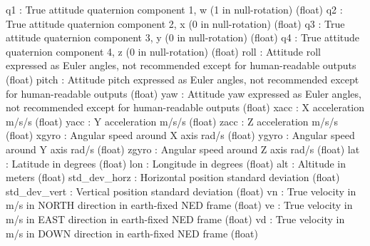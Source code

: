 \begin{DoxyVerb}
\begin{DoxyVerb}
\begin{DoxyVerb}
\begin{DoxyVerb}
\begin{DoxyVerb}
\begin{DoxyVerb}
\begin{DoxyVerb}
\begin{DoxyVerb}
\begin{DoxyVerb}
\begin{DoxyVerb}
\begin{DoxyVerb}
q1                        : True attitude quaternion component 1, w (1 in null-rotation) (float)
q2                        : True attitude quaternion component 2, x (0 in null-rotation) (float)
q3                        : True attitude quaternion component 3, y (0 in null-rotation) (float)
q4                        : True attitude quaternion component 4, z (0 in null-rotation) (float)
roll                      : Attitude roll expressed as Euler angles, not recommended except for human-readable outputs (float)
pitch                     : Attitude pitch expressed as Euler angles, not recommended except for human-readable outputs (float)
yaw                       : Attitude yaw expressed as Euler angles, not recommended except for human-readable outputs (float)
xacc                      : X acceleration m/s/s (float)
yacc                      : Y acceleration m/s/s (float)
zacc                      : Z acceleration m/s/s (float)
xgyro                     : Angular speed around X axis rad/s (float)
ygyro                     : Angular speed around Y axis rad/s (float)
zgyro                     : Angular speed around Z axis rad/s (float)
lat                       : Latitude in degrees (float)
lon                       : Longitude in degrees (float)
alt                       : Altitude in meters (float)
std_dev_horz              : Horizontal position standard deviation (float)
std_dev_vert              : Vertical position standard deviation (float)
vn                        : True velocity in m/s in NORTH direction in earth-fixed NED frame (float)
ve                        : True velocity in m/s in EAST direction in earth-fixed NED frame (float)
vd                        : True velocity in m/s in DOWN direction in earth-fixed NED frame (float)\end{DoxyVerb}
 \mbox{\label{classpymavlink_1_1dialects_1_1v10_1_1MAVLink_a31313ecf6b3e740b9f8c7e5927558fe9}} 

\end{DoxyVerb}
\end{DoxyVerb}
\end{DoxyVerb}
\end{DoxyVerb}
\end{DoxyVerb}
\end{DoxyVerb}
\end{DoxyVerb}
\end{DoxyVerb}
\end{DoxyVerb}
\end{DoxyVerb}
